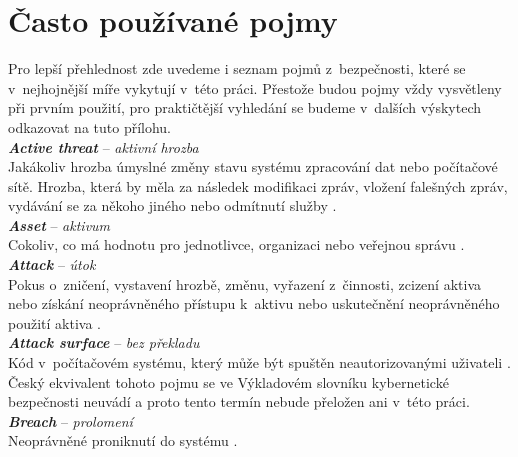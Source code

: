 \chapter{Často používané pojmy} \label{app:concepts}
Pro lepší přehlednost zde uvedeme i seznam pojmů z~bezpečnosti, které se v~nejhojnější míře vykytují v~této práci. Přestože budou pojmy vždy vysvětleny při prvním použití, pro praktičtější vyhledání se budeme v~dalších výskytech odkazovat na tuto přílohu. \\

\textit{\textbf{Active threat}} -- \textit{aktivní hrozba} \label{app:a:activethreat} \\ %
Jakákoliv hrozba úmyslné změny stavu systému zpracování dat nebo počítačové sítě. Hrozba, která by měla za následek modifikaci zpráv, vložení falešných zpráv, vydávání se za někoho jiného nebo odmítnutí služby \cite[str. 16]{Slovnik2015}. \\

\textit{\textbf{Asset}} -- \textit{aktivum} \label{app:a:asset} \\
Cokoliv, co má hodnotu pro jednotlivce, organizaci nebo veřejnou správu \cite[str. 17]{Slovnik2015}. \\

\textit{\textbf{Attack}} -- \textit{útok} \label{app:a:attack} \\ %
Pokus o~zničení, vystavení hrozbě, změnu, vyřazení z~činnosti, zcizení aktiva nebo získání neoprávněného přístupu k~aktivu nebo uskutečnění neoprávněného použití aktiva 
\cite[\mbox{str. 121}]{Slovnik2015}.  \\

\textit{\textbf{Attack surface}} -- \textit{bez překladu} \label{app:a:attacksurface} \\
Kód v~počítačovém systému, který může být spuštěn neautorizovanými uživateli \cite[\mbox{str. 20}]{Slovnik2015}. 
Český ekvivalent tohoto pojmu se ve Výkladovém slovníku kybernetické bezpečnosti \mbox{neuvádí} a proto tento termín nebude přeložen ani v~této práci. \\

\textit{\textbf{Breach}} -- \textit{prolomení} \label{app:a:breach} \\ %
Neoprávněné proniknutí do systému \cite[str. 92]{Slovnik2015}. \\


